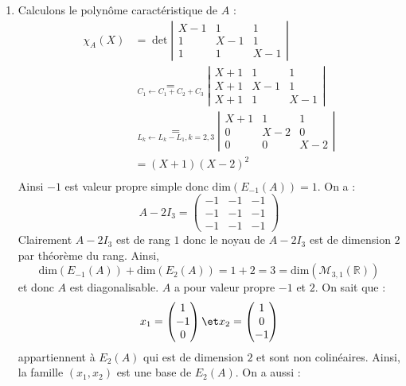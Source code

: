 \documentclass[a4paper,10pt]{report}
\begin{document}
\corr 
\begin{enumerate}
\item Calculons le polynôme caractéristique de $A$ :
\begin{align*}
\chi_A(X) & =\det \left\vert  \begin{array}{*{20}{c}}
{X - 1}&1&1\\
1&{X - 1}&1\\
1&1&{X - 1}
\end{array}  \right\vert \\
&  \underset{{C_1} \leftarrow {C_1} + {C_2} + {C_3}}{=} \left\vert \begin{array}{*{20}{c}}
{X + 1}&1&1\\
{X + 1}&{X - 1}&1\\
{X + 1}&1&{X - 1} 
\end{array} \right\vert  \\
&  \underset{{L_k} \leftarrow {L_k} - {L_1}, k=2,3}{=}  \left\vert \begin{array}{*{20}{c}}
{X + 1}&1&1\\
0&{X - 2}&0\\
0&0&{X - 2}
\end{array} \right\vert \\
& = \left( {X + 1} \right){\left( {X - 2} \right)^2} \\
\end{align*}
Ainsi $-1$ est valeur propre simple donc $\textrm{dim}(E_{-1}(A))=1$. On a :
$$ A-2I_3 = \left(\begin{array}{ccc}
-1 & -1 & -1\\
-1 & -1 & -1\\
-1 & -1 & -1
\end{array}\right)$$
Clairement $A-2I_3$ est de rang $1$ donc le noyau de $A-2I_3$ est de dimension $2$ par théorème du rang. Ainsi,
$$ \textrm{dim}(E_{-1}(A)) + \textrm{dim}(E_2(A)) = 1+2 = 3 = \textrm{dim}(\mathcal{M}_{3,1}(\mathbb{R}))$$
et donc $A$ est diagonalisable. $A$ a pour valeur propre $-1$ et $2$. On sait que :
$$ x_1= \begin{pmatrix}
1 \\
 -1 \\ 0 
\end{pmatrix} \et x_2=\begin{pmatrix}
1 \\
0 \\
-1
\end{pmatrix}$$
appartiennent à $E_2(A)$ qui est de dimension $2$ et sont non colinéaires. Ainsi, la famille $(x_1,x_2)$ est une base de $E_2(A)$. On a aussi :

\end{enumerate}
\end{document}
